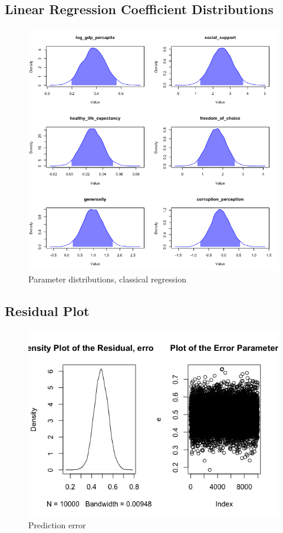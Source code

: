 \documentclass{article}
\begin{document}
\subsection{Linear Regression Coefficient Distributions}
\begin{figure}[h!]
\centering
\includegraphics[scale=.7]{distributions.png}
\caption{\label{fig:dist-basic}Parameter distributions, classical regression}
\end{figure}

\begin{samepage}
\pagebreak
\subsection{Residual Plot}
\begin{figure}[h!]
\centering
\includegraphics[scale=.6]{Rsidual.png}
\caption{\label{fig:pred} Prediction error}
\end{figure}
\end{samepage}
\end{document}
